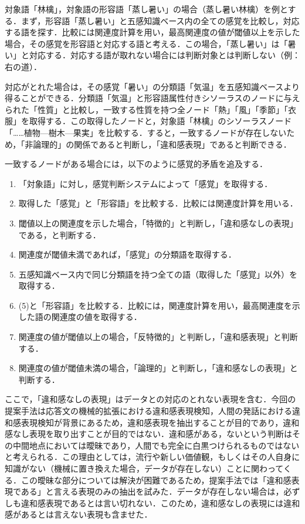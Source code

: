 \documentclass[japanese]{jnlp_1.4}
\begin{document}
対象語「林檎」，対象語の形容語「蒸し暑い」の場合（蒸し暑い林檎）を例とする．まず，形容語「蒸し暑い」と五感知識ベース内の全ての感覚を比較し，対応する語を探す．比較には関連度計算を用い，最高関連度の値が閾値以上を示した場合，その感覚を形容語と対応する語と考える．この場合，「蒸し暑い」は「暑い」と対応する．対応する語が取れない場合には判断対象とは判断しない（例：右の道）．

対応がとれた場合は，その感覚「暑い」の分類語「気温」を五感知識ベースより得ることができる．分類語「気温」と形容語属性付きシソーラスのノードに与えられた「性質」と比較し，一致する性質を持つ全ノード「熱」「風」「季節」「衣服」を取得する．この取得したノードと，対象語「林檎」のシソーラスノード「……植物—樹木—果実」を比較する．すると，一致するノードが存在しないため，「非論理的」の関係であると判断し，「違和感表現」であると判断できる．

一致するノードがある場合には，以下のように感覚的矛盾を追及する．
\begin{enumerate}
	\item 「対象語」に対し，感覚判断システムによって「感覚」を取得する．
	\item 取得した「感覚」と「形容語」を比較する．比較には関連度計算を用いる．
	\item 閾値以上の関連度を示した場合，「特徴的」と判断し，「違和感なしの表現」である，と判断する．
	\item 関連度が閾値未満であれば，「感覚」の分類語を取得する．
	\item 五感知識ベース内で同じ分類語を持つ全ての語（取得した「感覚」以外）を取得する．
	\item (5)と「形容語」を比較する．比較には，関連度計算を用い，最高関連度を示した語の関連度の値を取得する．
	\item 関連度の値が閾値以上の場合，「反特徴的」と判断し，「違和感表現」と判断する．
	\item 関連度の値が閾値未満の場合，「論理的」と判断し，「違和感なしの表現」と判断する．
\end{enumerate}

ここで，「違和感なしの表現」はデータとの対応のとれない表現を含む．今回の提案手法は応答文の機械的拡張における違和感表現検知，人間の発話における違和感表現検知が背景にあるため，違和感表現を抽出することが目的であり，違和感なし表現を取り出すことが目的ではない．違和感がある，ないという判断はその中間地点においては曖昧であり，人間でも完全に白黒つけられるものではないと考えられる．この理由としては，流行や新しい価値観，もしくはその人自身に知識がない（機械に置き換えた場合，データが存在しない）ことに関わってくる．この曖昧な部分については解決が困難であるため，提案手法では「違和感表現である」と言える表現のみの抽出を試みた．データが存在しない場合は，必ずしも違和感表現であるとは言い切れない．このため，違和感なしの表現には違和感があるとは言えない表現も含ませた．
\end{document}
